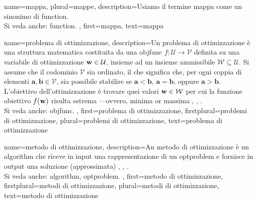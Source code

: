 {name={mappa}, plural={mappe}, 
	description={Usiamo il termine mappa come un 
	sinonimo di \gls{function}.
	\\
	Si veda anche: \gls{function}.
	},
	first={mappa},
	text={mappa}
}


{name={problema di ottimizzazione}, 
	description={Un problema di ottimizzazione è una struttura 
		   matematica costituita da una \gls{objfunc} $f: \mathcal{U} \rightarrow \mathcal{V}$ 
		   definita su una variabile di ottimizzazione ${\bf w} \in \mathcal{U}$, insieme ad un 
		   insieme ammissibile $\mathcal{W} \subseteq \mathcal{U}$. Si assume che il codominio $\mathcal{V}$  
		   sia ordinato, il che significa che, per ogni coppia di elementi $\mathbf{a}, \mathbf{b} \in \mathcal{V}$, 
		   sia possibile stabilire se $\mathbf{a} < \mathbf{b}$, $\mathbf{a} = \mathbf{b}$, 
		   oppure $\mathbf{a} > \mathbf{b}$. L’obiettivo dell’ottimizzazione è trovare quei valori  ${\bf w} \in \mathcal{W}$ 
		   per cui la funzione obiettivo $f({\bf w})$ risulta estrema —ovvero, minima or massima \cite{BoydConvexBook}, \cite{nesterov04}, \cite{BertsekasNonLinProgr}.
		   \\
		   Si veda anche: \gls{objfunc}.
	},
	first={problema di ottimizzazione},
	firstplural={problemi di ottimizzazione}, 
	plural={problemi di ottimizzazione}, 
	text={problema di ottimizzazione}
}

{name={metodo di ottimizzazione},
	description={An metodo di ottimizzazione è un \gls{algorithm} che 
		riceve in input una rappresentazione di un \gls{optproblem} e fornisce in output una soluzione (approssimata) 
		\cite{BoydConvexBook}, \cite{nesterov04}, \cite{BertsekasNonLinProgr}.
		 \\
		 Si veda anche: \gls{algorithm}, \gls{optproblem}.
	},
	first={metodo di ottimizzazione},
	firstplural={metodi di ottimizzazione}, 
	plural={metodi di ottimizzazione}, 
	text={metodo di ottimizzazione}
}

